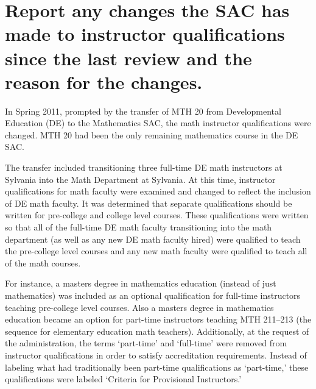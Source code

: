 



\section[Changes to instructor qualifications]{Report any changes the SAC has
 made to instructor qualifications since
the last review and the reason for the changes.}
In Spring 2011, prompted by the transfer of MTH 20 from Developmental
Education (DE) to the Mathematics SAC, the math instructor qualifications were
changed.  MTH 20 had been the only remaining mathematics course in the DE SAC.

The transfer included transitioning three full-time DE math instructors at
Sylvania into the Math Department at Sylvania.  At this time, instructor
qualifications for math faculty were examined and changed to reflect the
inclusion of DE math faculty.  It was determined that separate qualifications
should be written for pre-college and college level courses.  These
qualifications were written so that all of the full-time DE math faculty
transitioning into the math department (as well as any new DE math faculty
hired) were qualified to teach the pre-college level courses and any new math
faculty were qualified to teach all of the math courses.

For instance, a masters degree in mathematics education (instead of just
mathematics) was included as an optional qualification for full-time
instructors teaching pre-college level courses.  Also a masters degree in
mathematics education became an option for part-time instructors teaching MTH
211--213 (the sequence for elementary education math teachers).  Additionally,
at the request of the administration, the terms `part-time' and `full-time'
were removed from instructor qualifications in order to satisfy accreditation
requirements.  Instead of labeling what had traditionally been part-time
qualifications as `part-time,' these qualifications were labeled `Criteria for
Provisional Instructors.'

